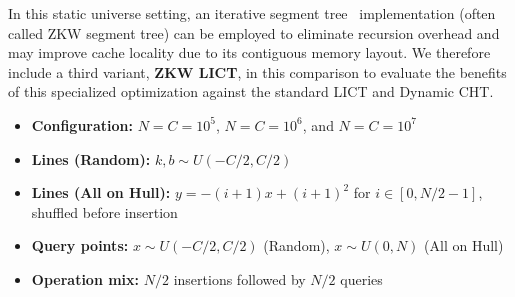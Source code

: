 \documentclass[11pt,a4paper]{article}
\theoremstyle{definition}
\theoremstyle{plain}
\begin{document}
In this static universe setting, an iterative segment tree~\cite{zkw2010} implementation (often called ZKW segment tree) can be employed to eliminate recursion overhead and may improve cache locality due to its contiguous memory layout. We therefore include a third variant, \textbf{ZKW LICT}, in this comparison to evaluate the benefits of this specialized optimization against the standard LICT and Dynamic CHT.

\begin{itemize}
\item \textbf{Configuration:} $N = C = 10^5$, $N = C = 10^6$, and $N = C = 10^7$
\item \textbf{Lines (Random):} $k, b \sim U(-C/2, C/2)$
\item \textbf{Lines (All on Hull):} $y = -(i+1)x + (i+1)^2$ for $i \in [0, N/2 - 1]$, shuffled before insertion
\item \textbf{Query points:} $x \sim U(-C/2, C/2)$ (Random), $x \sim U(0, N)$ (All on Hull)
\item \textbf{Operation mix:} $N/2$ insertions followed by $N/2$ queries
\end{itemize}
\end{document}
